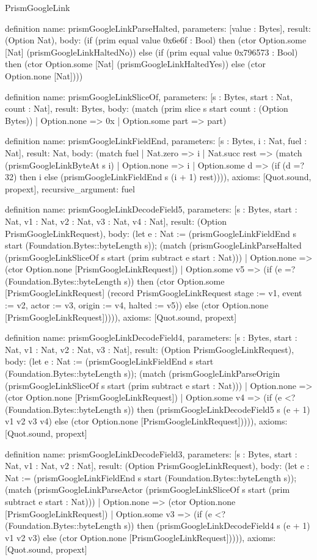 \begin{lexlean}{PrismGoogleLink}
\begin{semanticmodule}
definition{
  name: prismGoogleLinkParseHalted,
  parameters: [value : Bytes],
  result: (Option Nat),
  body: (if (prim equal value 0x6e6f : Bool) then (ctor Option.some [Nat] (prismGoogleLinkHaltedNo)) else (if (prim equal value 0x796573 : Bool) then (ctor Option.some [Nat] (prismGoogleLinkHaltedYes)) else (ctor Option.none [Nat])))
}

definition{
  name: prismGoogleLinkSliceOf,
  parameters: [s : Bytes, start : Nat, count : Nat],
  result: Bytes,
  body: (match (prim slice s start count : (Option Bytes))
    | Option.none => 0x
    | Option.some part => part)
}

definition{
  name: prismGoogleLinkFieldEnd,
  parameters: [s : Bytes, i : Nat, fuel : Nat],
  result: Nat,
  body: (match fuel
    | Nat.zero => i
    | Nat.succ rest => (match (prismGoogleLinkByteAt s i)
      | Option.none => i
      | Option.some d => (if (d =? 32) then i else (prismGoogleLinkFieldEnd s (i + 1) rest)))),
  axioms: [Quot.sound, propext],
  recursive_argument: fuel
}

definition{
  name: prismGoogleLinkDecodeField5,
  parameters: [s : Bytes, start : Nat, v1 : Nat, v2 : Nat, v3 : Nat, v4 : Nat],
  result: (Option PrismGoogleLinkRequest),
  body: (let e : Nat := (prismGoogleLinkFieldEnd s start (Foundation.Bytes::byteLength s)); (match (prismGoogleLinkParseHalted (prismGoogleLinkSliceOf s start (prim subtract e start : Nat)))
    | Option.none => (ctor Option.none [PrismGoogleLinkRequest])
    | Option.some v5 => (if (e =? (Foundation.Bytes::byteLength s)) then (ctor Option.some [PrismGoogleLinkRequest] (record PrismGoogleLinkRequest {stage := v1, event := v2, actor := v3, origin := v4, halted := v5})) else (ctor Option.none [PrismGoogleLinkRequest])))),
  axioms: [Quot.sound, propext]
}

definition{
  name: prismGoogleLinkDecodeField4,
  parameters: [s : Bytes, start : Nat, v1 : Nat, v2 : Nat, v3 : Nat],
  result: (Option PrismGoogleLinkRequest),
  body: (let e : Nat := (prismGoogleLinkFieldEnd s start (Foundation.Bytes::byteLength s)); (match (prismGoogleLinkParseOrigin (prismGoogleLinkSliceOf s start (prim subtract e start : Nat)))
    | Option.none => (ctor Option.none [PrismGoogleLinkRequest])
    | Option.some v4 => (if (e <? (Foundation.Bytes::byteLength s)) then (prismGoogleLinkDecodeField5 s (e + 1) v1 v2 v3 v4) else (ctor Option.none [PrismGoogleLinkRequest])))),
  axioms: [Quot.sound, propext]
}

definition{
  name: prismGoogleLinkDecodeField3,
  parameters: [s : Bytes, start : Nat, v1 : Nat, v2 : Nat],
  result: (Option PrismGoogleLinkRequest),
  body: (let e : Nat := (prismGoogleLinkFieldEnd s start (Foundation.Bytes::byteLength s)); (match (prismGoogleLinkParseActor (prismGoogleLinkSliceOf s start (prim subtract e start : Nat)))
    | Option.none => (ctor Option.none [PrismGoogleLinkRequest])
    | Option.some v3 => (if (e <? (Foundation.Bytes::byteLength s)) then (prismGoogleLinkDecodeField4 s (e + 1) v1 v2 v3) else (ctor Option.none [PrismGoogleLinkRequest])))),
  axioms: [Quot.sound, propext]
}


\end{semanticmodule}
\end{lexlean}
